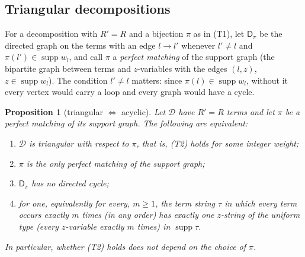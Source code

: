 \documentclass[11pt]{article}
\newtheorem{proposition}[theorem]{Proposition}
\theoremstyle{definition}
\theoremstyle{remark}
\DeclareMathOperator{\supp}{supp}
\newcommand{\Tcond}[1]{\textup{(T#1)}}        %
\newcommand{\Dpi}{\mathsf D_\pi}             %
\begin{document}
\subsection{Triangular decompositions}\label{cp:sec:tr:tri}

For a decomposition with $R'=R$ and a bijection $\pi$ as in \Tcond1, let $\Dpi$ be the directed graph on the terms with an edge $l\to l'$ whenever $l'\ne l$ and $\pi(l')\in\supp w_l$, and call $\pi$ a \emph{perfect matching} of the support graph (the bipartite graph between terms and $z$-variables with the edges $(l,z)$, $z\in\supp w_l$). The condition $l'\ne l$ matters: since $\pi(l)\in\supp w_l$, without it every vertex would carry a loop and every graph would have a cycle.

\begin{proposition}[triangular $\Leftrightarrow$ acyclic]\label{cp:C4}
Let $\mathcal D$ have $R'=R$ terms and let $\pi$ be a perfect matching of its support graph. The following are equivalent:
\begin{enumerate}[label=(\alph*)]
\item $\mathcal D$ is triangular with respect to $\pi$, that is, \Tcond2{} holds for some integer weight;
\item $\pi$ is the only perfect matching of the support graph;
\item $\Dpi$ has no directed cycle;
\item for one, equivalently for every, $m\ge1$, the term string $\tau$ in which every term occurs exactly $m$ times (in any order) has exactly one $z$-string of the uniform type (every $z$-variable exactly $m$ times) in $\supp\tau$.
\end{enumerate}
In particular, whether \Tcond2{} holds does not depend on the choice of $\pi$.
\end{proposition}
\end{document}
